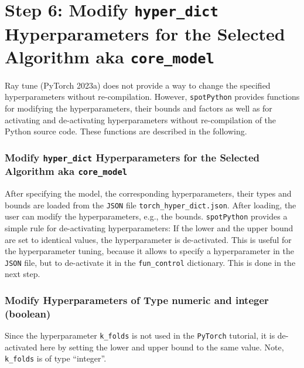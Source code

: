 \documentclass[
  letterpaper,
  DIV=11,
  numbers=noendperiod]{scrreprt}
\begin{document}
\hypertarget{sec-modification-of-hyperparameters-14}{%
\section{\texorpdfstring{Step 6: Modify \texttt{hyper\_dict}
Hyperparameters for the Selected Algorithm aka
\texttt{core\_model}}{Step 6: Modify hyper\_dict Hyperparameters for the Selected Algorithm aka core\_model}}\label{sec-modification-of-hyperparameters-14}}

Ray tune (PyTorch 2023a) does not provide a way to change the specified
hyperparameters without re-compilation. However, \texttt{spotPython}
provides functions for modifying the hyperparameters, their bounds and
factors as well as for activating and de-activating hyperparameters
without re-compilation of the Python source code. These functions are
described in the following.

\hypertarget{sec-modification-of-default-values}{%
\subsubsection{\texorpdfstring{Modify \texttt{hyper\_dict}
Hyperparameters for the Selected Algorithm aka
\texttt{core\_model}}{Modify hyper\_dict Hyperparameters for the Selected Algorithm aka core\_model}}\label{sec-modification-of-default-values}}

After specifying the model, the corresponding hyperparameters, their
types and bounds are loaded from the \texttt{JSON} file
\texttt{torch\_hyper\_dict.json}. After loading, the user can modify the
hyperparameters, e.g., the bounds. \texttt{spotPython} provides a simple
rule for de-activating hyperparameters: If the lower and the upper bound
are set to identical values, the hyperparameter is de-activated. This is
useful for the hyperparameter tuning, because it allows to specify a
hyperparameter in the \texttt{JSON} file, but to de-activate it in the
\texttt{fun\_control} dictionary. This is done in the next step.

\hypertarget{modify-hyperparameters-of-type-numeric-and-integer-boolean}{%
\subsubsection{Modify Hyperparameters of Type numeric and integer
(boolean)}\label{modify-hyperparameters-of-type-numeric-and-integer-boolean}}

Since the hyperparameter \texttt{k\_folds} is not used in the
\texttt{PyTorch} tutorial, it is de-activated here by setting the lower
and upper bound to the same value. Note, \texttt{k\_folds} is of type
``integer''.
\end{document}
